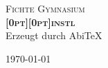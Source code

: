 \begin{titlepage}

\begin{center}



\textsc{\LARGE Fichte Gymnasium}\\[1.5cm]




\textsc{ \huge \bfseries \raisebox{0pt}[0pt][0pt]{inst\/\raisebox{-0.2ex}{A}\raisebox{-0.4ex}{B}\raisebox{0.1ex}{I}\/l}}
\vspace {1cm}
\\Erzeugt durch Abi\TeX



\vfill

{\large \today}

\end{center}

\end{titlepage}
